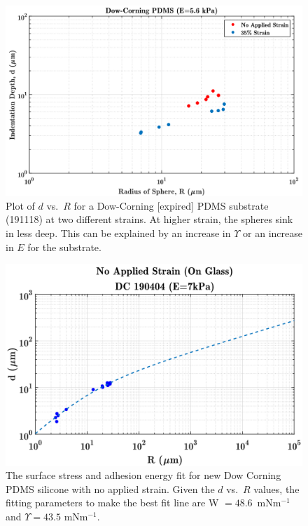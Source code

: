 \begin{figure}[h]
	\centering
	\includegraphics[width=\linewidth]{Chapters/Figures/d_vs_r_stretch_vs_nostretch.pdf}
	\caption[D vs. R Dow-Corning]{Plot of $ d $ vs.~$ R $ for a Dow-Corning [expired] PDMS substrate (191118) at two different strains. At higher strain, the spheres sink in less deep. This can be explained by an increase in $\Upsilon$ or an increase in $E$ for the substrate.}
	\label{fig:dvsrstretchvsnostretchdc181115}
\end{figure}

\begin{figure}[h]
	\centering
	\includegraphics[width=\linewidth]{Chapters/Figures/WUps_fit_DC190404}
	\caption[Dow Corning W-$\Upsilon $ Fit]{The surface stress and adhesion energy fit for new Dow Corning PDMS silicone with no applied strain. Given the $ d $ vs.~$ R $ values, the fitting parameters to make the best fit line are W $ = 48.6$~mNm$^{-1}$ and  $\Upsilon = 43.5$ mNm$^{-1}$.}
	\label{fig:wupsfitdc190404}
\end{figure}

